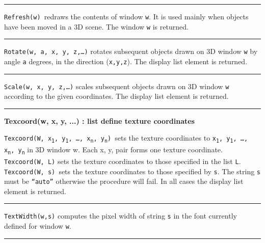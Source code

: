 \bigskip\hrule\vspace{0.1cm}

\noindent
\texttt{Refresh(w) }redraws the contents of window \texttt{w}. It is
used mainly when objects have been moved in a 3D scene. The window
\texttt{w} is returned. 

\bigskip\hrule\vspace{0.1cm}

\noindent
\texttt{Rotate(w, a, x, y, z,{\dots})} rotates subsequent objects drawn
on 3D window \texttt{w} by angle \texttt{a} degrees, in the direction
(\texttt{x,y,z}). The display list element is returned.

\bigskip\hrule\vspace{0.1cm}

\noindent
\texttt{Scale(w, x, y, z,{\dots})} scales subsequent objects drawn on 3D
window \texttt{w} according to the given coordinates. The display list
element is returned.

\bigskip\hrule\vspace{0.1cm}
\noindent
{\bf Texcoord(w, x, y, ...) : list \hfill define texture coordinates}

\noindent
\texttt{Texcoord(W, x}\texttt{\textsubscript{1}}\texttt{,
y}\texttt{\textsubscript{1}}\texttt{, {\dots},
x}\texttt{\textsubscript{n}}\texttt{,
y}\texttt{\textsubscript{n}}\texttt{) }sets the texture coordinates to
\texttt{x}\texttt{\textsubscript{1}}\texttt{,
y}\texttt{\textsubscript{1}}\texttt{, {\dots},
x}\texttt{\textsubscript{n}}\texttt{, y}\texttt{\textsubscript{n}} in
3D window w. Each x, y, pair forms one texture coordinate.
\texttt{Texcoord(W, L)} sets the texture coordinates to those specified
in the list \texttt{L}. \texttt{Texcoord(W, s) }sets the texture
coordinates to those specified by \texttt{s}. The string \texttt{s}
must be \texttt{{\textquotedblleft}auto{\textquotedblright}} otherwise
the procedure will fail. In all cases the display list element is
returned.

\bigskip\hrule\vspace{0.1cm}

\noindent
\texttt{TextWidth(w,s)} computes the pixel width of string \texttt{s} in
the font currently defined for window \texttt{w}.

\bigskip\hrule\vspace{0.1cm}

